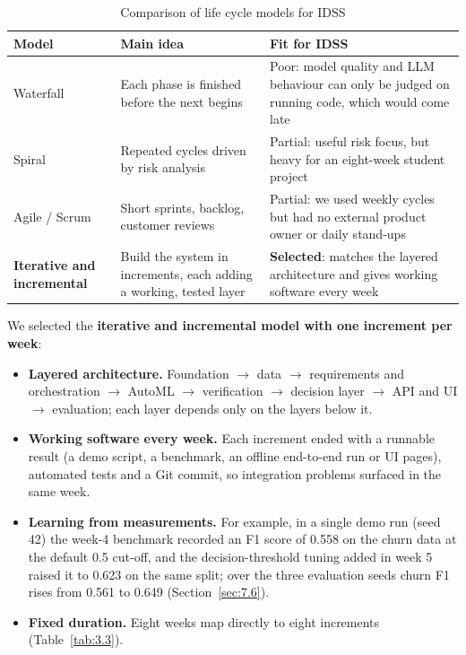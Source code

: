 \begin{table}[H]
\centering
\linespread{1}\small
\setlength{\tabcolsep}{4pt}
\caption{Comparison of life cycle models for IDSS}\label{tab:1.1}
\begin{tabular}{|>{\raggedright\arraybackslash\hspace{0pt}}p{}|>{\raggedright\arraybackslash\hspace{0pt}}p{}|>{\raggedright\arraybackslash\hspace{0pt}}p{}|}
\hline
\rowcolor{tableheader}\textbf{Model} & \textbf{Main idea} & \textbf{Fit for IDSS} \\
\hline
Waterfall & Each phase is finished before the next begins & Poor: model quality and LLM behaviour can only be judged on running code, which would come late \\ \hline
Spiral & Repeated cycles driven by risk analysis & Partial: useful risk focus, but heavy for an eight-week student project \\ \hline
Agile / Scrum & Short sprints, backlog, customer reviews & Partial: we used weekly cycles but had no external product owner or daily stand-ups \\ \hline
\textbf{Iterative and incremental} & Build the system in increments, each adding a working, tested layer & \textbf{Selected}: matches the layered architecture and gives working software every week \\ \hline
\end{tabular}
\end{table}

We selected the \textbf{iterative and incremental model with one increment per week}:

\begin{itemize}
  \item \textbf{Layered architecture.} Foundation \ensuremath{\rightarrow} data \ensuremath{\rightarrow} requirements and orchestration \ensuremath{\rightarrow} AutoML \ensuremath{\rightarrow} verification \ensuremath{\rightarrow} decision layer \ensuremath{\rightarrow} API and UI \ensuremath{\rightarrow} evaluation; each layer depends only on the layers below it.
  \item \textbf{Working software every week.} Each increment ended with a runnable result (a demo script, a benchmark, an offline end-to-end run or UI pages), automated tests and a Git commit, so integration problems surfaced in the same week.
  \item \textbf{Learning from measurements.} For example, in a single demo run (seed 42) the week-4 benchmark recorded an F1 score of 0.558 on the churn data at the default 0.5 cut-off, and the decision-threshold tuning added in week 5 raised it to 0.623 on the same split; over the three evaluation seeds churn F1 rises from 0.561 to 0.649 (Section~\ref{sec:7.6}).
  \item \textbf{Fixed duration.} Eight weeks map directly to eight increments (Table~\ref{tab:3.3}).
\end{itemize}

